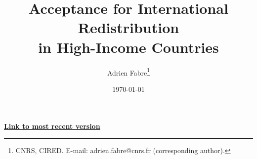 \documentclass[12pt,english]{article}
\title{Acceptance for International Redistribution\\
in High-Income Countries
}
\author{Adrien Fabre\footnote{CNRS, CIRED. E-mail: adrien.fabre@cnrs.fr (corresponding author).}
} %
\date{\today} %
\begin{document}
\maketitle

\begin{center}
{\textbf{\href{https://github.com/bixiou/robustness_global_redistr/raw/main/papers/support_global_redistr.pdf}{Link to most recent version}}}
\end{center}


\end{document}
